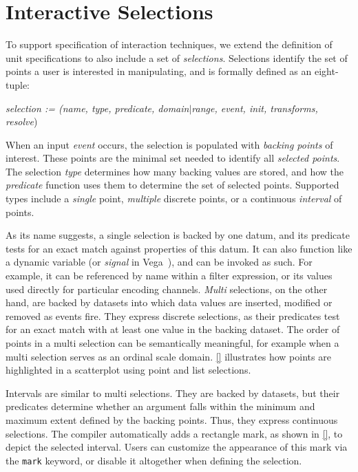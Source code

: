 \section{Interactive Selections}
\label{sec:vl:goi}

To support specification of interaction techniques, we extend the definition of
unit specifications to also include a set of \emph{selections}. Selections
identify the set of points a user is interested in manipulating, and is formally
defined as an eight-tuple:

\centerline{
  \emph{selection := (name, type, predicate, domain$|$range, event, init,
  transforms, resolve})
}

When an input \emph{event} occurs, the selection is populated with \emph{backing
points} of interest. These points are the minimal set needed to identify all
\emph{selected points}. The selection \emph{type} determines how many backing
values are stored, and how the \emph{predicate} function uses them to determine
the set of selected points. Supported types include a \emph{single} point,
\emph{multiple} discrete points, or a continuous \emph{interval} of points.

As its name suggests, a single selection is backed by one datum, and its
predicate tests for an exact match against properties of this datum. It can also
function like a dynamic variable (or \emph{signal} in
Vega~\cite{reactive-vega-model}), and can be invoked as such. For example, it
can be referenced by name within a filter expression, or its values used
directly for particular encoding channels. \emph{Multi} selections, on the other
hand, are backed by datasets into which data values are inserted, modified or
removed as events fire. They express discrete selections, as their predicates
test for an exact match with at least one value in the backing dataset. The
order of points in a multi selection can be semantically meaningful, for example
when a multi selection serves as an ordinal scale domain.
\cref{} illustrates how points are highlighted in a scatterplot
using point and list selections.

Intervals are similar to multi selections. They are backed by datasets, but
their predicates determine whether an argument falls within the minimum and
maximum extent defined by the backing points. Thus, they express continuous
selections. The compiler automatically adds a rectangle mark, as shown in
\cref{}, to depict the selected interval. Users can
customize the appearance of this mark via the \texttt{mark} keyword, or disable
it altogether when defining the selection.

